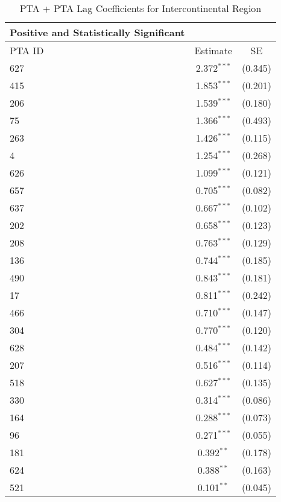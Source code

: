 \begin{table}[htbp]
    \centering
    \caption{PTA + PTA Lag Coefficients for Intercontinental Region}
    \label{tab:pta_intercontinental}
    \begin{adjustbox}{max width=\textwidth}
    \begin{tabular}{lcc}
    \hline
    \textbf{Positive and Statistically Significant} &  &  \\
    \hline
    PTA ID & Estimate & SE \\
    \hline
    627 & 2.372$^{\ast\ast\ast}$ & (0.345) \\
    415 & 1.853$^{\ast\ast\ast}$ & (0.201) \\
    206 & 1.539$^{\ast\ast\ast}$ & (0.180) \\
    75  & 1.366$^{\ast\ast\ast}$ & (0.493) \\
    263 & 1.426$^{\ast\ast\ast}$ & (0.115) \\
    4   & 1.254$^{\ast\ast\ast}$ & (0.268) \\
    626 & 1.099$^{\ast\ast\ast}$ & (0.121) \\
    657 & 0.705$^{\ast\ast\ast}$ & (0.082) \\
    637 & 0.667$^{\ast\ast\ast}$ & (0.102) \\
    202 & 0.658$^{\ast\ast\ast}$ & (0.123) \\
    208 & 0.763$^{\ast\ast\ast}$ & (0.129) \\
    136 & 0.744$^{\ast\ast\ast}$ & (0.185) \\
    490 & 0.843$^{\ast\ast\ast}$ & (0.181) \\
    17  & 0.811$^{\ast\ast\ast}$ & (0.242) \\
    466 & 0.710$^{\ast\ast\ast}$ & (0.147) \\
    304 & 0.770$^{\ast\ast\ast}$ & (0.120) \\
    628 & 0.484$^{\ast\ast\ast}$ & (0.142) \\
    207 & 0.516$^{\ast\ast\ast}$ & (0.114) \\
    518 & 0.627$^{\ast\ast\ast}$ & (0.135) \\
    330 & 0.314$^{\ast\ast\ast}$ & (0.086) \\
    164 & 0.288$^{\ast\ast\ast}$ & (0.073) \\
    96 & 0.271$^{\ast\ast\ast}$ & (0.055) \\
    181 & 0.392$^{\ast\ast}$ & (0.178) \\
    624 & 0.388$^{\ast\ast}$ & (0.163) \\
    521 & 0.101$^{\ast\ast}$ & (0.045) \\

\end{tabular}
\end{adjustbox}
\end{table}
